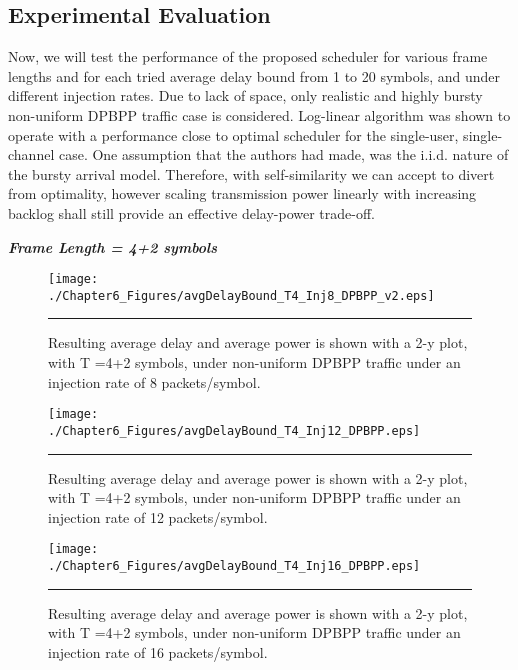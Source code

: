 \subsection{Experimental Evaluation}

Now, we will test the performance of the proposed scheduler for various frame lengths and for each tried average delay bound from 1 to 20 symbols, and under different injection rates. Due to lack of space, only realistic and highly bursty non-uniform DPBPP traffic case is considered. Log-linear algorithm was shown to operate with a performance close to optimal scheduler for the single-user, single-channel case. One assumption that the authors had made, was the i.i.d. nature of the bursty arrival model. Therefore, with self-similarity we can accept to divert from optimality, however scaling transmission power linearly with increasing backlog shall still provide an effective delay-power trade-off.





\textbf{\textit{Frame Length = 4+2 symbols}}


\begin{figure}[t!]
  \centering
    \texttt{[image: ./Chapter6\_Figures/avgDelayBound\_T4\_Inj8\_DPBPP\_v2.eps]}
    \rule{35em}{0.5pt}
  \caption[Resulting average delay and average power is shown with a 2-y plot, with T =4+2 symbols, under non-uniform DPBPP traffic under an injection rate of 8 packets/symbol.]{Resulting average delay and average power is shown with a 2-y plot, with T =4+2 symbols, under non-uniform DPBPP traffic under an injection rate of 8 packets/symbol.} 
  \label{fig:Electron}
\end{figure}

\begin{figure}[t!]
  \centering
    \texttt{[image: ./Chapter6\_Figures/avgDelayBound\_T4\_Inj12\_DPBPP.eps]}
    \rule{35em}{0.5pt}
  \caption[Resulting average delay and average power is shown with a 2-y plot, with T =4+2 symbols, under non-uniform DPBPP traffic under an injection rate of 8 packets/symbol.]{Resulting average delay and average power is shown with a 2-y plot, with T =4+2 symbols, under non-uniform DPBPP traffic under an injection rate of 12 packets/symbol.} 
  \label{fig:Electron}
\end{figure}

\begin{figure}[t!]
  \centering
    \texttt{[image: ./Chapter6\_Figures/avgDelayBound\_T4\_Inj16\_DPBPP.eps]}
    \rule{35em}{0.5pt}
  \caption[Resulting average delay and average power is shown with a 2-y plot, with T =4+2 symbols, under non-uniform DPBPP traffic under an injection rate of 16 packets/symbol.]{Resulting average delay and average power is shown with a 2-y plot, with T =4+2 symbols, under non-uniform DPBPP traffic under an injection rate of 16 packets/symbol.} 
  \label{fig:Electron}
\end{figure}

